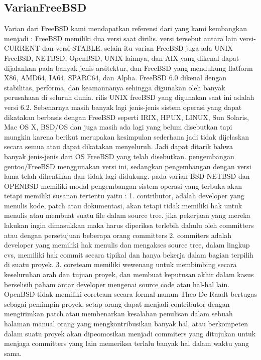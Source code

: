 \subsection{VarianFreeBSD}
	Varian dari FreeBSD kami mendapatkan referensi dari \cite{nugroho2015analisis} yang kami kembangkan menjadi :
	FreeBSD memiliki dua versi saat dirilis. versi tersebut antara lain versi-CURRENT dan versi-STABLE. selain itu varian FreeBSD juga ada UNIX FreeBSD, NETBSD, OpenBSD, UNIX lainnya, dan AIX yang dikenal dapat dijalankan pada banyak jenis arsitektur, dan FreeBSD yang mendukung flatform X86, AMD64, IA64, SPARC64, dan Alpha.
	FreeBSD 6.0 dikenal dengan stabilitas, performa, dan keamannanya sehingga digunakan oleh banyak perusahaan di seluruh dunia. rilis UNIX freeBSD yang digunakan saat ini adalah versi 6.2. 
	Sebenarnya masih banyak lagi jenis-jenis sistem operasi yang dapat dikatakan berbasis dengan FreeBSD seperti IRIX, HPUX, LINUX, Sun Solaris, Mac OS X, BSD/OS dan juga masih ada lagi yang belum disebutkan tapi mungkin karena berikut merupakan kesimpulan sederhana jadi tidak dijelaskan secara semua atau dapat dikatakan menyeluruh. 
	Jadi dapat ditarik bahwa banyak jenis-jenis dari OS FreeBSD yang telah disebutkan.
	pengembangan gentoo/FreeBSD menggunakan versi ini, sedangkan  pengembangan dengan versi lama telah dihentikan dan tidak lagi didukung. pada varian BSD NETBSD dan OPENBSD memiliki modal pengembangan sistem operasi yang terbuka akan tetapi memiliki susanan tertentu yaitu :
	1. contributor, adalah developer yang menulis kode, patch atau dokumentasi, akan tetapi tidak memiliki hak untuk menulis atau membuat suatu file dalam source tree. jika pekerjaan yang mereka lakukan ingin dimasukkan maka harus diperiksa terlebih dahulu oleh committers atau dengan persetujuan beberapa orang committers
	2. commiters adalah developer yang memiliki hak menulis dan mengakses source tree, dalam lingkup cvs, memiliki hak commit secara tipikal dan hanya bekerja dalam bagian terpilih di suatu proyek.
	3. coreteam memiliki wewenang untuk membimbing secara keseluruhan arah dan tujuan proyek, dan membuat keputusan akhir dalam kasus berselisih paham antar developer mengenai source code atau hal-hal lain. OpenBSD tidak memiliki coreteam secara formal namun Theo De Raadt bertugas sebagai pemimpin proyek.
	setap orang dapat menjadi contributor dengan mengirimkan patch atau membenarkan kesalahan penulisan dalam sebuah halaman manual orang yang mengkontribusikan banyak hal, atau berkompeten dalam suatu proyek akan dipeomosikan menjadi commiters yang ditujukan untuk menjaga committers yang lain memeriksa terlalu banyak hal dalam waktu yang sama.
